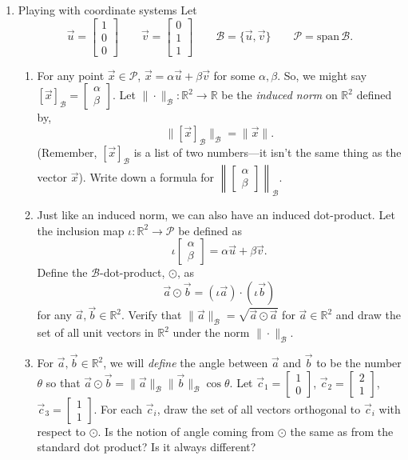 \documentclass[letter]{article}
\newcommand{\R}{\mathbb{R}}
\newcommand{\Span}{\mathrm{span}}
\newcommand{\mat}[1]{\begin{bmatrix}#1\end{bmatrix}}
\begin{document}
\begin{enumerate}
		\item {\sc Playing with coordinate systems} Let
			\[
				\vec u=\mat{1\\0\\0}\qquad\vec v=\mat{0\\1\\1}\qquad \mathcal B=\{\vec u,\vec v\}\qquad \mathcal P=\Span\,\mathcal B.
			\]
			\begin{enumerate}
				\item 
				For any point $\vec x\in\mathcal P$, $\vec x=\alpha\vec u+\beta\vec v$ for some $\alpha,\beta$.
				So, we might say $[\vec x]_{\mathcal B} =\mat{\alpha\\\beta}$.  Let $\|\cdot\|_{\mathcal B}:\R^2\to\R$
				be the \emph{induced norm} on $\R^2$ defined by,
				\[
					\|[\vec x]_{\mathcal B}\|_{\mathcal B} = \|\vec x\|.
				\]
				(Remember, $[\vec x]_{\mathcal B}$ is a list of two numbers---it isn't the same thing as the vector $\vec x$).
				Write down a formula for $\left\|\mat{\alpha\\\beta}\right\|_{\mathcal B}$.

				\item Just like an induced norm, we can also have an induced dot-product.  Let the
					inclusion map $\iota:\R^2\to\mathcal P$
					be defined as
					\[
						\iota\mat{\alpha\\\beta} = \alpha \vec u+\beta\vec v.
					\]
					Define the $\mathcal B$-dot-product, $\odot$, as 
					\[
						\vec a\odot \vec b = (\iota \vec a)\cdot (\iota \vec b)
					\]
					for any $\vec a,\vec b\in\R^2$.  Verify that $\|\vec a\|_{\mathcal B} = \sqrt{\vec a\odot\vec a}$
					for $\vec a\in\R^2$ and draw the set of all unit vectors in $\R^2$ under the norm $\|\cdot\|_{\mathcal B}$.
				\item For $\vec a,\vec b\in\R^2$, we will \emph{define} the angle between $\vec a$ and $\vec b$
					to be the number $\theta$ so that $\vec a\odot\vec b=\|\vec a\|_{\mathcal B}\|\vec b\|_{\mathcal B}\cos\theta$.
					Let $\vec c_1=\mat{1\\0}$, $\vec c_2=\mat{2\\1}$, $\vec c_3=\mat{1\\1}$.  For each $\vec c_i$, draw
					the set of all vectors orthogonal to $\vec c_i$ with respect to $\odot$.  Is the notion of
					angle coming from $\odot$ the same as from the standard dot product?  Is it always different?



\end{enumerate}
\end{enumerate}
\end{document}
